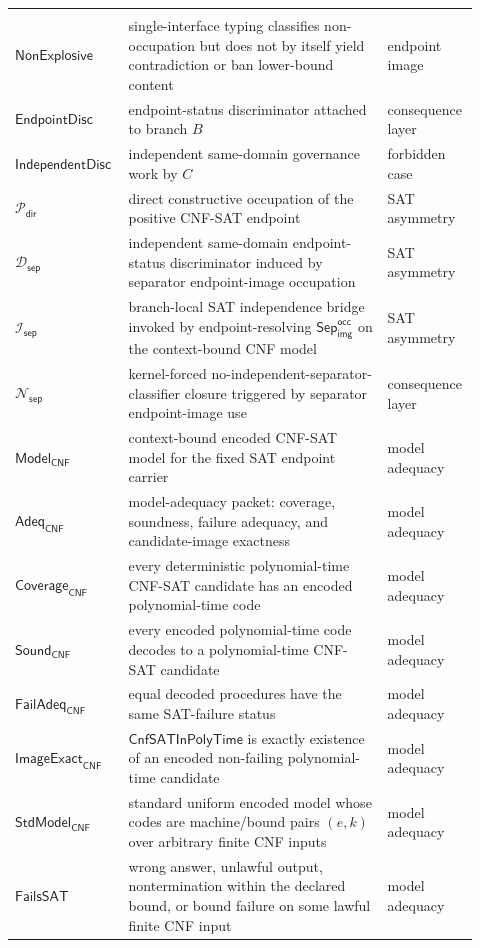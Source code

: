 \documentclass[11pt]{article}
\theoremstyle{definition}
\theoremstyle{remark}
\newcommand{\SepImgOcc}{\mathsf{Sep}_{\mathsf{img}}^{\mathsf{occ}}}
\newcommand{\CnfSATP}{\mathsf{CnfSATInPolyTime}}
\newcommand{\EndpointDisc}{\mathsf{EndpointDisc}}
\newcommand{\IndDisc}{\mathsf{IndependentDisc}}
\newcommand{\DirPos}{\mathcal{P}_{\mathsf{dir}}}
\newcommand{\SepIndBridge}{\mathcal{I}_{\mathsf{sep}}}
\newcommand{\SepDisc}{\mathcal{D}_{\mathsf{sep}}}
\newcommand{\NoSepDisc}{\mathcal{N}_{\mathsf{sep}}}
\newcommand{\ModelOfCnf}{\mathsf{Model}_{\mathsf{CNF}}}
\newcommand{\ModelAdeq}{\mathsf{Adeq}_{\mathsf{CNF}}}
\newcommand{\ModelCoverage}{\mathsf{Coverage}_{\mathsf{CNF}}}
\newcommand{\ModelSound}{\mathsf{Sound}_{\mathsf{CNF}}}
\newcommand{\FailureAdeq}{\mathsf{FailAdeq}_{\mathsf{CNF}}}
\newcommand{\ImageExact}{\mathsf{ImageExact}_{\mathsf{CNF}}}
\newcommand{\FailsSAT}{\mathsf{FailsSAT}}
\begin{document}
\begin{longtable}{>{\raggedright\arraybackslash}p{0.21\linewidth}>{\raggedright\arraybackslash}p{0.54\linewidth}>{\raggedright\arraybackslash}p{0.17\linewidth}}
\begin{tabular}[t]{@{}l@{}}\(\mathsf{SingleInterface}\)\\\(\mathsf{NonExplosive}\)\end{tabular} & single-interface typing classifies non-occupation but does not by itself yield contradiction or ban lower-bound content & endpoint image \\
\(\EndpointDisc\) & endpoint-status discriminator attached to branch \(B\) & consequence layer \\
\(\IndDisc\) & independent same-domain governance work by \(C\) & forbidden case \\
\(\DirPos\) & direct constructive occupation of the positive CNF-SAT endpoint & SAT asymmetry \\
\(\SepDisc\) & independent same-domain endpoint-status discriminator induced by separator endpoint-image occupation & SAT asymmetry \\
\(\SepIndBridge\) & branch-local SAT independence bridge invoked by endpoint-resolving \(\SepImgOcc\) on the context-bound CNF model & SAT asymmetry \\
\(\NoSepDisc\) & kernel-forced no-independent-separator-classifier closure triggered by separator endpoint-image use & consequence layer \\
\(\ModelOfCnf\) & context-bound encoded CNF-SAT model for the fixed SAT endpoint carrier & model adequacy \\
\(\ModelAdeq\) & model-adequacy packet: coverage, soundness, failure adequacy, and candidate-image exactness & model adequacy \\
\(\ModelCoverage\) & every deterministic polynomial-time CNF-SAT candidate has an encoded polynomial-time code & model adequacy \\
\(\ModelSound\) & every encoded polynomial-time code decodes to a polynomial-time CNF-SAT candidate & model adequacy \\
\(\FailureAdeq\) & equal decoded procedures have the same SAT-failure status & model adequacy \\
\(\ImageExact\) & \(\CnfSATP\) is exactly existence of an encoded non-failing polynomial-time candidate & model adequacy \\
\(\mathsf{StdModel}_{\mathsf{CNF}}\) & standard uniform encoded model whose codes are machine/bound pairs \((e,k)\) over arbitrary finite CNF inputs & model adequacy \\
\(\FailsSAT\) & wrong answer, unlawful output, nontermination within the declared bound, or bound failure on some lawful finite CNF input & model adequacy \\

\end{longtable}
\end{document}
